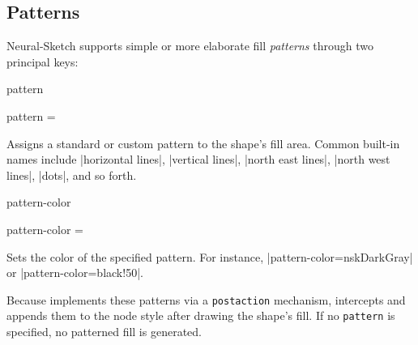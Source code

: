 \documentclass[show-experimental]{l3doc}
\begin{document}
\begin{nskexample}[sidebyside, righthand width=4.5cm]
	\begin{nskFigure}[center]
	\end{nskFigure}
\end{nskexample}

\subsection{Patterns}\label{sec:patterns-section}

Neural-Sketch supports simple or more elaborate fill \emph{patterns}
through two principal keys:

\begin{function}{pattern}
	\begin{syntax}
		pattern = 
	\end{syntax}
	Assigns a standard or custom  pattern to the shape’s fill
	area. Common built-in names include |horizontal lines|, |vertical lines|,
	|north east lines|, |north west lines|, |dots|, and so forth.
\end{function}

\begin{function}{pattern-color}
	\begin{syntax}
		pattern-color = \meta{color expression}
	\end{syntax}
	Sets the color of the specified pattern. For instance,
	|pattern-color=nskDarkGray| or |pattern-color=black!50|.
\end{function}

Because  implements these patterns via a \verb|postaction|
mechanism,  intercepts and appends them to the node
style after drawing the shape’s fill. If no \texttt{pattern} is
specified, no patterned fill is generated.

\begin{nskexample}[sidebyside, righthand width=5.5cm]
	\begin{nskFigure}[center]
	\end{nskFigure}
\end{nskexample}
\end{document}
